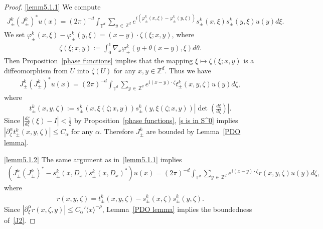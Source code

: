 \documentclass[10pt]{amsart}
\theoremstyle{definition}
\numberwithin{equation}{section}
\renewcommand{\a}{\alpha}
\newcommand{\f}{\varphi}
\newcommand{\z}{\zeta}
\newcommand{\x}{\xi}
\newcommand{\Z}{\mathbb{Z}}
\newcommand{\T}{\mathbb{T}}
\newcommand{\la}{\langle}
\newcommand{\ra}{\rangle}
\begin{document}
\begin{proof}
\eqref{lemm5.1.1} We compute
\begin{align*}
J_\pm^k \left(J_\pm^k\right)^* u(x) = (2\pi)^{-d} \int_{\T^d} \sum_{y\,\in\,\Z^d} e^{i\left(\f_{\pm}^k(x,\x)-\f_{\pm}^k(y,\x)\right)} s_\pm^k(x,\x) s_\pm^k(y,\x) u(y) d\x.
\end{align*}
We set $\f_{\pm}^k(x,\x)-\f_{\pm}^k(y,\x) = (x-y) \cdot \z(\x;x,y)$, where
\begin{align*}
\z(\x;x,y) := \int_0^1 \nabla_x \f_{\pm}^k(y+\theta(x-y),\x) d\theta.
\end{align*}
Then Proposition~\ref{phase functions} implies that the mapping $\x \mapsto \z(\x;x,y)$ is a diffeomorphism from $U$ into $\z(U)$ for any $x,y \in \Z^d$. Thus we have
\begin{align*}
J_\pm^k \left(J_\pm^k\right)^* u(x) = (2\pi)^{-d} \int_{\T^d} \sum_{y\,\in\,\Z^d} e^{i(x-y)\cdot\z} t_\pm^k(x,y,\z) u(y) d\z,
\end{align*}
where
\begin{align*}
t_\pm^k(x,y,\z):=s_\pm^k(x,\x(\z;x,y)) s_\pm^k(y,\x(\z;x,y)) \left|\det\left(\frac{d\x}{d\z} \right)\right|.
\end{align*}
Since $|\frac{d\z}{d\x}(\x) - I| < \frac{1}{2}$ by Proposition~\ref{phase functions}, \eqref{s is in S^0} implies $|\partial_{\z}^\a t_\pm^k(x,y,\z)|\leq C_\a$ for any $\a$. Therefore $J_\pm^k$ are bounded by Lemma~\ref{PDO lemma}.


\eqref{lemm5.1.2} The same argument as in~\eqref{lemm5.1.1} implies
\begin{align*}
\left(J_\pm^k \left(J_\pm^k\right)^* - s_\pm^k(x,D_x) s_\pm^k(x,D_x)^* \right) u(x) 
= (2\pi)^{-d} \int_{\T^d} \sum_{y\,\in\,\Z^d} e^{i(x-y)\cdot\z} r(x,y,\z) u(y) d\z,
\end{align*}
where
\begin{align*}
r(x,y,\z)=t_\pm^k(x,y,\z) - s_\pm^k(x,\z) s_\pm^k(y,\z).
\end{align*}
Since $|\partial_\x^\a r(x,\z,y)| \leq C_\a' \la x \ra^{-\rho}$, Lemma~\ref{PDO lemma} implies the boundedness of~\eqref{J2}.


\end{proof}
\end{document}
